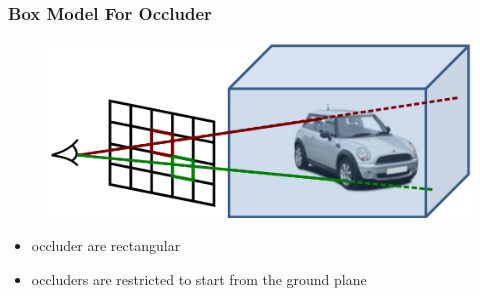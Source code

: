 \documentclass[xcolor=dvipsnames]{beamer}
\begin{document}
\begin{frame}
	\frametitle{Box Model For Occluder}
	
	\begin{figure}
		\includegraphics[width=.9\textwidth]{img/occ_state.png}
	\end{figure}
	
	\begin{itemize}
		\item occluder are rectangular
		\item occluders are restricted to start from the ground plane
	\end{itemize}
	
\end{frame}
\end{document}
